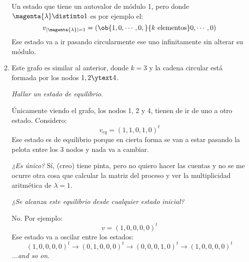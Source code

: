 \begin{enumerate}[label=\alph*)]
        Un estado que tiene un autovalor de módulo 1, pero donde $\magenta{\lambda} \distinto 1$ es por ejemplo el:
        $$
          v_{|\magenta{\lambda}| = 1} = (\ob{1, 0, \cdots, 0,}{k \text{ elementos}} 0, \cdots, 0)
        $$
        Ese estado va a ir pasando circularmente ese uno infinitamente sin alterar su módulo.
        {
        \footnotesize
        }

  \item

        Este grafo es similar al anterior, donde $k = 3$ y la cadena circular está formada por los nodos $1,2 \ytext 4$.

        \textit{Hallar un estado de equilibrio}.

        Únicamente viendo el grafo, los nodos 1, 2 y 4, tienen  de ir de uno a otro estado. Considero:
        $$
          v_{eq} = (1, 1, 0, 1, 0)^t
        $$
        Ese estado es de equilibrio porque en cierta forma se van a estar pasando la pelota entre los 3 nodos y nada va a cambiar.

        \bigskip

        \textit{¿Es único?} Sí, {\tiny (creo)} tiene pinta, pero no quiero hacer las cuentas y no se me ocurre otra cosa que
        calcular la matriz del proceso y ver la multiplicidad aritmética de $\lambda = 1$.

        \bigskip

        \textit{¿Se alcanza este equilibrio desde cualquier estado inicial?}

        No. Por ejemplo:
        $$
          v = (1, 0, 0, 0, 0)^t
        $$
        Ese estado va a oscilar entre los estados:
        $$
          (1, 0, 0, 0, 0)^t
          \to
          (0, 1, 0, 0, 0)^t
          \to
          (0, 0, 0, 1, 0)^t
          \to
          (1, 0, 0, 0, 0)^t
        $$
        \textit{...and so on.}

\end{enumerate}

\begin{aportes}
  \item {}
\end{aportes}


